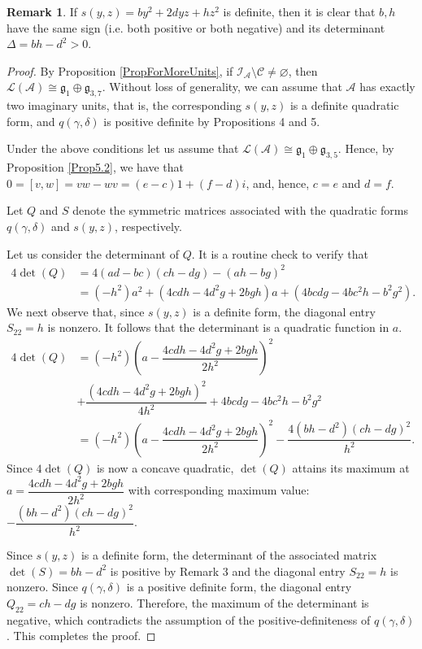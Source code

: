 \documentclass{amsart}
\theoremstyle{definition}
\newtheorem{remark}{Remark}
\theoremstyle{plain}
\begin{document}
\begin{remark}
If
$s(y,z)=by^2+2dyz+hz^2$ is definite, then it is clear that $b,h$ have the same sign (i.e. both positive or both negative) and its determinant $\Delta=bh-d^2>0.$
\end{remark}
\begin{proof} By Proposition \ref{PropForMoreUnits}, if $\mathcal{I_A}\setminus\mathcal{C}\neq \varnothing$, then $ \mathcal L (\mathcal A)\cong \mathfrak g_1\oplus \mathfrak g_{3,7}$.
Without loss of generality, we can assume that   $\mathcal{A}$ has exactly two imaginary units, that is, the corresponding $s(y,z)$ is a definite quadratic form, and  $q(\gamma,\delta)$ is positive definite by Propositions 4 and 5.


Under the above conditions let us assume that  $\mathcal{L}(\mathcal{A})\cong \mathfrak g_1\oplus \mathfrak g_{3,5}$. Hence, by Proposition \ref{Prop5.2}, we have that   $0= [v,w]=vw-wv=(e-c)1+(f-d)i$, and, hence,   $c=e$ and $d=f$.

Let $Q$ and $S$ denote the symmetric matrices associated with the quadratic forms $q(\gamma,\delta)$ and $s(y,z)$, respectively.

Let us consider the determinant of  $Q$. It is a routine check to verify that
\begin{align*}
4\det(Q)&=4(ad-bc)(ch-dg)-(ah-bg)^2\\
&=(-h^2)a^2+(4cdh-4d^2g+2bgh)a+(4bcdg-4bc^2h-b^2g^2).
\end{align*}
We next observe that, since $s(y,z)$ is a definite form, the diagonal entry $S_{22}=h$ is nonzero. It follows that the determinant is a quadratic function in $a$.
\begin{align*}
4\det(Q)&=(-h^2)\left(a-\dfrac{4cdh-4d^2g+2bgh}{2h^2}\right)^2\\
&+\dfrac{(4cdh-4d^2g+2bgh)^2}{4h^2}+4bcdg-4bc^2h-b^2g^2\\
&=(-h^2)\left(a-\dfrac{4cdh-4d^2g+2bgh}{2h^2}\right)^2-\dfrac{4(bh-d^2)(ch-dg)^2}{h^2}    .
\end{align*}
Since $4\det(Q)$ is now a concave quadratic, $\det(Q)$ attains its maximum at $a=\dfrac{4cdh-4d^2g+2bgh}{2h^2}$ with corresponding maximum value:  $-\dfrac{(bh-d^2)(ch-dg)^2}{h^2}$.
\par\medskip
Since $s(y,z)$ is a definite form, the determinant of the associated matrix $\det(S)=bh-d^2$ is positive by Remark 3 and the diagonal entry $S_{22}=h$ is nonzero. Since $q(\gamma,\delta)$ is a positive definite form, 
the diagonal entry $Q_{22}=ch-dg$ is nonzero. Therefore, the maximum of the determinant is negative, which contradicts the assumption of the positive-definiteness of $q(\gamma,\delta)$. This completes the proof.
\end{proof}
\end{document}

